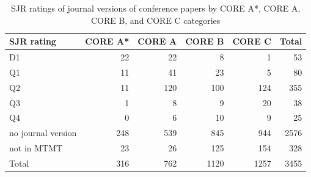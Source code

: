 \begin{table}[h]
  \centering
  \begin{tabular}{lrrrr|r}
    \toprule
    SJR rating & CORE A* & CORE A & CORE B & CORE C & Total \\
    \midrule
    D1 & 22 & 22 & 8 & 1 & 53 \\
    Q1 & 11 & 41 & 23 & 5 & 80 \\
    Q2 & 11 & 120 & 100 & 124 & 355 \\
    Q3 & 1 & 8 & 9 & 20 & 38 \\
    Q4 & 0 & 6 & 10 & 9 & 25 \\
    no journal version & 248 & 539 & 845 & 944 & 2576 \\
    not in MTMT & 23 & 26 & 125 & 154 & 328 \\
    \midrule
    Total & 316 & 762 & 1120 & 1257 & 3455 \\
    \bottomrule
  \end{tabular}
  \caption{SJR ratings of journal versions of conference papers by CORE A*, CORE A, CORE B, and CORE C categories}
  \label{tab:sjr_rating_summary}
\end{table}